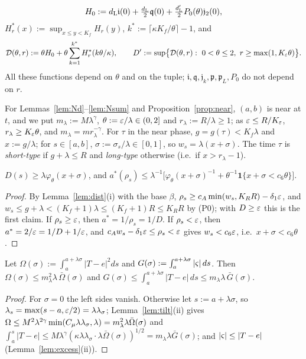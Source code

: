 \begin{definition}
\begin{align*}
H_0:=d_{\mathrm L}\mathfrak i(0)+\tfrac{d_{\mathrm L}}2\mathfrak q(0)+\tfrac{d_{\mathrm L}'}2P_0(\theta)\mathfrak j_2(0),
\end{align*}
$H_r^*(x):=\sup_{x\le y<K_f}H_r(y)$, $k^*:=\lceil\kappa K_f/\theta\rceil-1$, and
\[
\mathcal D(\theta,r):=\theta H_0+\theta\sum_{k=1}^{k^*}H_r^*(k\theta/\kappa),\qquad
D':=\sup\bigl\{\mathcal D(\theta,r):\ 0<\theta\le2,\ r\ge\max(1,\Keps\theta)\bigr\}.
\]
All these functions depend on $\theta$ and on the tuple; $\mathfrak i,\mathfrak q,\mathfrak j_k,\mathfrak p,\mathfrak p_L,P_0$ do not depend on $r$.
\end{definition}

For Lemmas~\ref{lem:Nd}--\ref{lem:Nsum} and Proposition~\ref{prop:near}, $(a,b)$ is near at $t$, and we put
$m_\lambda:=M\lambda^\gamma$, $\theta:=\varepsilon/\lambda\in(0,2]$ and $r_\lambda:=R/\lambda\ge1$; as $\varepsilon\le R/K_\varepsilon$, $r_\lambda\ge K_\varepsilon\theta$,
and $m_\lambda=mr_\lambda^{-\gamma}$. For $\tau$ in the near phase, $g=g(\tau)<K_f\lambda$ and $x:=g/\lambda$; for $s\in[a,b]$,
$\sigma:=\sigma_s/\lambda\in[0,1]$, so $w_s=\lambda(x+\sigma)$. The time $\tau$ is \emph{short-type} if $g+\lambda\le R$ and
\emph{long-type} otherwise (i.e.\ if $x>r_\lambda-1$).

\begin{lemma}[distance]\label{lem:Nd}
$D(s)\ge\lambda\varphi_\theta(x+\sigma)$, and $a^*(\rho_s)\le\lambda^{-1}\bigl[\varphi_\theta(x+\sigma)^{-1}+\theta^{-1}\mathbf 1\{x+\sigma<c_6\theta\}\bigr]$.
\end{lemma}

\begin{proof}
By Lemma~\ref{lem:dist}(i) with the base $\beta$, $\rho_s\ge c_A\min(w_s,K_RR)-\delta_1\varepsilon$, and
$w_s\le g+\lambda<(K_f+1)\lambda\le(K_f+1)R\le K_RR$ by (P0); with $D\ge\varepsilon$ this is the first claim. If $\rho_s\ge\varepsilon$, then
$a^*=1/\rho_s=1/D$. If $\rho_s<\varepsilon$, then $a^*=2/\varepsilon=1/D+1/\varepsilon$, and $c_Aw_s-\delta_1\varepsilon\le\rho_s<\varepsilon$ gives $w_s<c_6\varepsilon$, i.e.\
$x+\sigma<c_6\theta$.
\end{proof}

\begin{lemma}[budgets]\label{lem:Nb}
Let $\Omega(\sigma):=\int_a^{a+\lambda\sigma}|T-e|^2ds$ and $G(\sigma):=\int_a^{a+\lambda\sigma}|\varsigma|\,ds$. Then
$\Omega(\sigma)\le m_\lambda^2\lambda\,\bar\Omega(\sigma)$ and $G(\sigma)\le\int_a^{a+\lambda\sigma}|T-e|\,ds\le m_\lambda\lambda\,\bar G(\sigma)$.
\end{lemma}

\begin{proof}
For $\sigma=0$ the left sides vanish. Otherwise let $s:=a+\lambda\sigma$, so $\lambda_s=\max(s-a,\varepsilon/2)=\lambda\lambda_\sigma$;
Lemma~\ref{lem:tilt}(ii) gives $\Omega\le M^2\lambda^{2\gamma}\min(C_\mu\lambda\lambda_\sigma,\lambda)=m_\lambda^2\lambda\bar\Omega(\sigma)$ and
$\int_a^s|T-e|\le M\lambda^\gamma(\kappa\lambda\lambda_\sigma\cdot\lambda\bar\Omega(\sigma))^{1/2}=m_\lambda\lambda\bar G(\sigma)$; and
$|\varsigma|\le|T-e|$ (Lemma~\ref{lem:excess}(ii)).
\end{proof}

